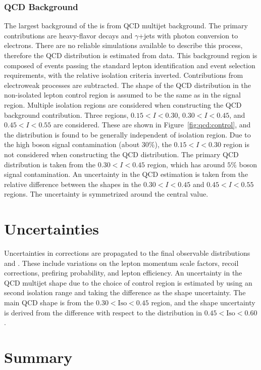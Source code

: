  
\subsubsection{QCD Background}\label{ch:w:qcd}
The largest background of the \W is from QCD multijet background. The primary contributions are heavy-flavor decays and $\gamma$+jets with photon conversion to electrons. There are no reliable simulations available to describe this process, therefore the QCD  \mt distribution is estimated from data. This background region is composed of events passing the standard lepton identification and event selection requirements, with the relative isolation criteria inverted. Contributions from electroweak processes are subtracted. The shape of the QCD \mt distribution in the non-isolated lepton control region is assumed to be the same as in the signal region. Multiple isolation regions are considered when constructing the QCD background contribution. Three regions, $0.15 < I < 0.30$, $0.30 < I < 0.45$, and $0.45 < I < 0.55$ are considered. These are shown in Figure~\ref{fig:qcd:control}, and the \mt distribution is found to be generally independent of isolation region. Due to the high \W boson signal contamination (about $30\%$), the $0.15 < I < 0.30$ region is not considered when constructing the QCD \mt distribution. The primary QCD \mt distribution is taken from the $0.30 < I < 0.45$ region, which has around $5\%$ \W boson signal contamination. An uncertainty in the QCD estimation is taken from the relative difference between the \mt shapes in the $0.30 < I < 0.45$ and $0.45 < I < 0.55$ regions. The uncertainty is symmetrized around the central value.


\section{Uncertainties}\label{ch:unc}
Uncertainties in corrections are propagated to the final observable distributions \mt and \mll. These include variations on the lepton momentum scale factors, recoil corrections, prefiring probability, and lepton efficiency.
An uncertainty in the QCD multijet shape due to the choice of control region is estimated by using an second isolation range and taking the difference as the shape uncertainty. The main QCD \mt shape is from the $0.30 < \mathrm{Iso} < 0.45$ region, and the shape uncertainty is derived from the difference with respect to the \mt distribution in $0.45 < \mathrm{Iso} < 0.60$.

\section{Summary}

